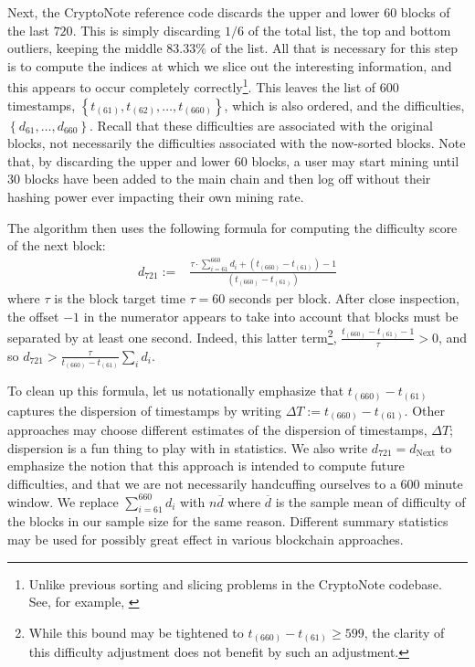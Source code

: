 \documentclass[12pt,english]{mrl}
\theoremstyle{definition}
\renewcommand{\geq}{\geqslant}
\numberwithin{equation}{section}
\numberwithin{figure}{section}
\numberwithin{equation}{section}
\numberwithin{equation}{section}
\numberwithin{figure}{section}
\begin{document}
Next, the CryptoNote reference code discards the upper and lower $60$ blocks of the last $720$. This is simply discarding $1/6$ of the total list, the top and bottom outliers, keeping the middle $83.33\%$ of the list. All that is necessary for this step is to compute the indices at which we slice out the interesting information, and this appears to occur completely correctly\footnote{Unlike previous sorting and slicing problems in the CryptoNote codebase. See, for example, \cite{macheta2014counterfeiting}}.  This leaves the list of $600$ timestamps, $\left\{t_{(61)}, t_{(62)}, \ldots, t_{(660)}\right\}$, which is also ordered, and the difficulties, $\left\{d_{61}, \ldots, d_{660}\right\}$. Recall that these difficulties are associated with the original blocks, not necessarily the difficulties associated with the now-sorted blocks. Note that, by discarding the upper and lower $60$ blocks, a user may start mining until $30$ blocks have been added to the main chain and then log off without their hashing power ever impacting their own mining rate.

The algorithm then uses the following formula for computing the difficulty score of the next block:
\begin{align}
d_{721} :=&\frac{\tau \cdot  \sum_{i=61}^{660} d_i + \left(t_{(660)} - t_{(61)}\right) - 1}{\left(t_{(660)} - t_{(61)}\right)} \label{diffFormInitial}
\end{align}
where $\tau$ is the block target time $\tau = 60$ seconds per block. After close inspection, the offset $-1$ in the numerator appears to take into account that blocks must be separated by at least one second. Indeed, this latter term\footnote{While this bound may be tightened to $t_{(660)} - t_{(61)} \geq 599$, the clarity of this difficulty adjustment does not benefit by such an adjustment.}, $\frac{t_{(660)} - t_{(61)} - 1}{\tau} > 0$, and so $d_{721} > \frac{\tau}{t_{(660)} - t_{(61)}} \sum_i d_i$. 

To clean up this formula, let us notationally emphasize that $t_{(660)} - t_{(61)}$ captures the dispersion of timestamps by writing $\Delta T := t_{(660)} - t_{(61)}$. Other approaches may choose different estimates of the dispersion of timestamps, $\Delta T$; dispersion is a fun thing to play with in statistics. We also write $d_{721} = d_{\text{Next}}$ to emphasize the notion that this approach is intended to compute future difficulties, and that we are not necessarily handcuffing ourselves to a $600$ minute window. We replace $\sum_{i=61}^{660} d_i$ with $n \overline{d}$ where $\overline{d}$ is the sample mean of difficulty of the blocks in our sample size for the same reason. Different summary statistics may be used for possibly great effect in various blockchain approaches.
\end{document}
